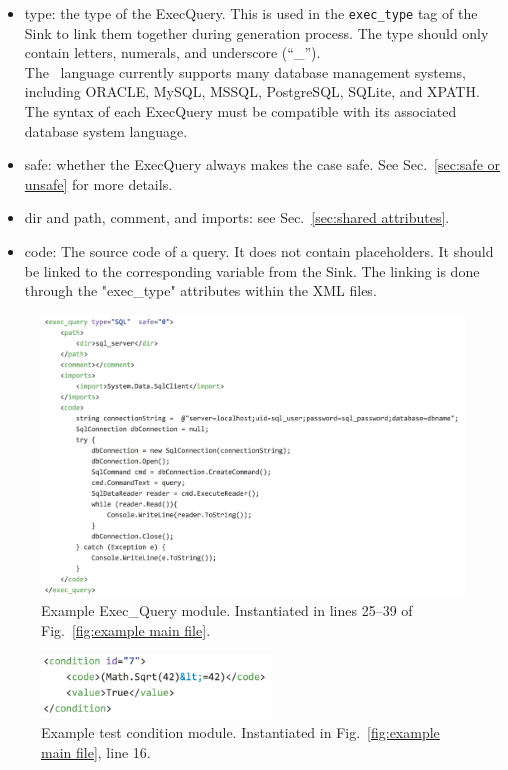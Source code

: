 \begin{itemize}
    \item type: the type of the ExecQuery. This is used in the
    \verb|exec_type| tag of the Sink to link them together during
    generation process.  The type should only contain letters, numerals, and
    underscore (``\_'').\\
    The \CSharp\ language currently supports many database management
    systems, including ORACLE, MySQL, MSSQL, PostgreSQL, SQLite, and XPATH.
    The syntax of each ExecQuery must be
    compatible with its associated database system language.
    
    \item safe: whether the ExecQuery always makes the case safe.
    See Sec.~\ref{sec:safe or unsafe} for more details.

    \item dir and path, comment, and imports: see Sec.~\ref{sec:shared attributes}.

    \item code: The source code of a query. It does not contain placeholders.
    It should be linked to the corresponding variable from the Sink. The linking is
    done through the "exec\_type" attributes within the XML files.
\end{itemize}


\begin{figure}[tbp]
  \includegraphics[width=\linewidth]{fig_Exec_Query_file.png}
  \caption{Example Exec\_Query module. Instantiated in lines 25--39 of
    Fig.~\ref{fig:example main file}.}
  \label{fig:example exec-query file}
\end{figure}

\begin{figure}[tbp]
  \includegraphics[width=2.4in]{fig_Complexity_file_test.png}
  \caption{Example test condition module.  Instantiated in
    Fig.~\ref{fig:example main file}, line 16.}
  \label{fig:example complexity-test file}
\end{figure}

